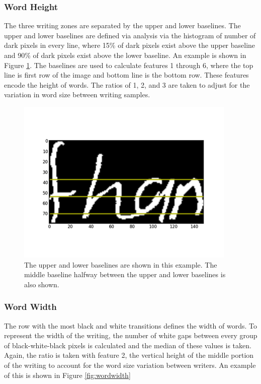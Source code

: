 \documentclass[paper=a4, fontsize=11pt]{scrartcl} %
\numberwithin{equation}{section} %
\numberwithin{figure}{section} %
\numberwithin{table}{section} %
\begin{document}
\subsubsection{Word Height}
The three writing zones are separated by the upper and lower
baselines. The upper and lower baselines are defined via analysis via
the histogram of number of dark pixels in every line, where 15\% of
dark pixels exist above the upper baseline and 90\% of dark pixels
exist above the lower baseline. An example is shown in Figure
\ref{fig:wordheight}. The baselines are used to calculate features 1
through 6, where the top line is first row of the image and bottom
line is the bottom row. These features encode the height of words. The
ratios of 1, 2, and 3 are taken to adjust for the variation in word
size between writing samples.

\begin{figure}
  \centering \includegraphics{wordheight.png}
  \caption{The upper and lower baselines are shown in this
    example. The middle baseline halfway between the upper and lower
    baselines is also shown.}
  \label{fig:wordheight}
\end{figure}

\subsubsection{Word Width}
The row with the most black and white transitions defines the width of
words. To represent the width of the writing, the number of white gaps
between every group of black-white-black pixels is calculated and the
median of these values is taken. Again, the ratio is taken with feature 2,
the vertical height of the middle portion of the writing to account
for the word size variation between writers. An example of this is
shown in Figure \ref{fig:wordwidth}
\end{document}

